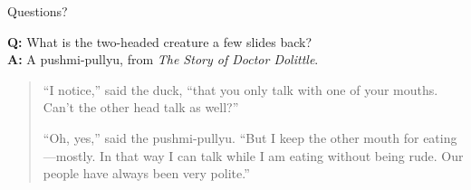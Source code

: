\documentclass[12pt]{beamer}
\begin{document}
\begin{frame}{Questions?}
  \vspace{4.5cm}

  \footnotesize
  \textbf{Q:} What is the two-headed creature a few slides back?\\
  \textbf{A:} A pushmi-pullyu, from \textit{The Story of Doctor Dolittle}.

  \begin{quote}
    ``I notice,'' said the duck, ``that you only talk with one of your
    mouths. Can't the other head talk as well?''

    ``Oh, yes,'' said the pushmi-pullyu. ``But I keep the other mouth
    for eating---mostly. In that way I can talk while I am eating
    without being rude. Our people have always been very polite.''
  \end{quote}
\end{frame}
\end{document}
